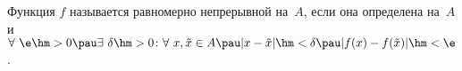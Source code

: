\label{ravnep}
Функция $f$ называется равномерно непрерывной на~$A$, если она определена на~$A$ и $\forall\ \e\hm>0\pau
\exists\  \delta\hm>0\colon \forall\  x,\tilde x\in A\pau |x-\tilde x|\hm<\delta\pau |f(x)-f(\tilde x)|\hm<\e$.
 